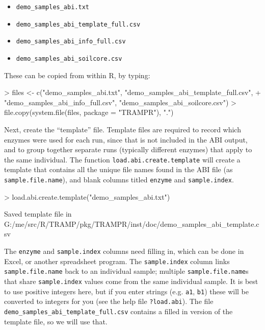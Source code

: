 \documentclass[a4paper]{article}
\newcommand\code\texttt
\newcommand\R{\textsf{R}}
\newcommand{\help}[1]{\texttt{?#1}}
\begin{document}
\begin{itemize}
\item \code{demo\_samples\_abi.txt}
\item \code{demo\_samples\_abi\_template\_full.csv}
\item \code{demo\_samples\_abi\_info\_full.csv}
\item \code{demo\_samples\_abi\_soilcore.csv}
\end{itemize}

These can be copied from within \R, by typing:

\begin{Schunk}
\begin{Sinput}
> files <- c("demo_samples_abi.txt", "demo_samples_abi_template_full.csv", 
+     "demo_samples_abi_info_full.csv", "demo_samples_abi_soilcore.csv")
> file.copy(system.file(files, package = "TRAMPR"), ".")
\end{Sinput}
\end{Schunk}

Next, create the ``template'' file.  Template files are required to
record which enzymes were used for each run, since that is not
included in the ABI output, and to group together separate runs
(typically different enzymes) that apply to the same individual.  The
function \code{load.abi.create.template} will create a template that
contains all the unique file names found in the ABI file (as
\code{sample.file.name}), and blank columns titled \code{enzyme} and
\code{sample.index}.

\begin{Schunk}
\begin{Sinput}
> load.abi.create.template("demo_samples_abi.txt")
\end{Sinput}
\begin{Soutput}
Saved template file in G:/me/src/R/TRAMP/pkg/TRAMPR/inst/doc/demo_samples_abi_template.csv
\end{Soutput}
\end{Schunk}

The \code{enzyme} and \code{sample.index} columns need filling in,
which can be done in Excel, or another spreadsheet program.  The
\code{sample.index} column links \code{sample.file.name} back to an
individual sample; multiple \code{sample.file.name}s that share
\code{sample.index} values come from the same individual sample.  It
is best to use positive integers here, but if you enter strings (e.g.
\code{a1}, \code{b1}) these will be converted to integers for you (see
the help file \help{load.abi}).  The file
\code{demo\_samples\_abi\_template\_full.csv} contains a filled in
version of the template file, so we will use that.
\end{document}
